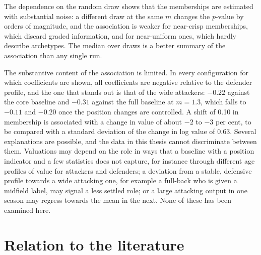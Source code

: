The dependence on the random draw shows that the memberships are estimated with substantial noise: a different draw at the same $m$ changes the $p$-value by orders of magnitude, and the association is weaker for near-crisp memberships, which discard graded information, and for near-uniform ones, which hardly describe archetypes. The median over draws is a better summary of the association than any single run.

The substantive content of the association is limited. In every configuration for which coefficients are shown, all coefficients are negative relative to the defender profile, and the one that stands out is that of the wide attackers: $-0.22$ against the core baseline and $-0.31$ against the full baseline at $m=1.3$, which falls to $-0.11$ and $-0.20$ once the position changes are controlled. A shift of 0.10 in membership is associated with a change in value of about $-2$ to $-3$ per cent, to be compared with a standard deviation of the change in log value of 0.63. Several explanations are possible, and the data in this thesis cannot discriminate between them. Valuations may depend on the role in ways that a baseline with a position indicator and a few statistics does not capture, for instance through different age profiles of value for attackers and defenders; a deviation from a stable, defensive profile towards a wide attacking one, for example a full-back who is given a midfield label, may signal a less settled role; or a large attacking output in one season may regress towards the mean in the next. None of these has been examined here.

\section{Relation to the literature}
\label{sec:disc-literature}

